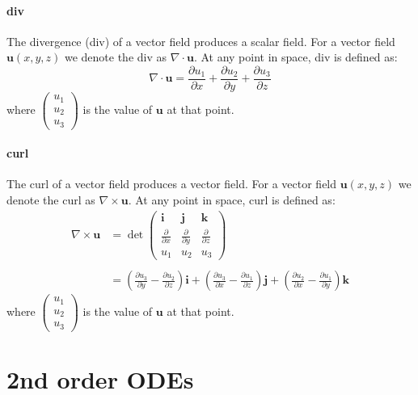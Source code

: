 \documentclass{scrartcl}
\renewcommand{\vec}[1]{\mathbf{#1}}
\begin{document}
\paragraph{div}
The divergence (div) of a vector field produces a scalar field. For a vector field $ \vec{u}(x, y, z) $ we denote the div as $ \nabla \cdot \vec{u} $. At any point in space, div is defined as:
\begin{equation}
\nabla \cdot \vec{u} = \frac{\partial u_{1}}{\partial x} + \frac{\partial u_{2}}{\partial y} + \frac{\partial u_{3}}{\partial z}
\end{equation}
where $ \begin{pmatrix}
u_{1} \\ u_{2} \\ u_{3}
\end{pmatrix} $ is the value of $ \vec{u} $ at that point.

\paragraph{curl}
The curl of a vector field produces a vector field. For a vector field $ \vec{u}(x, y, z) $ we denote the curl as $ \nabla \times \vec{u} $. At any point in space, curl is defined as:
\begin{align}
\nabla \times \vec{u} & = \det \begin{pmatrix}
\vec{i} & \vec{j} & \vec{k} \\
\frac{\partial}{\partial x} & \frac{\partial}{\partial y} & \frac{\partial}{\partial z} \\
u_{1} & u_{2} & u_{3}
\end{pmatrix} \\\\
& = (\frac{\partial u_{3}}{\partial y} - \frac{\partial u_{2}}{\partial z})\vec{i} + (\frac{\partial u_{3}}{\partial x} - \frac{\partial u_{1}}{\partial z})\vec{j} + (\frac{\partial u_{2}}{\partial x} - \frac{\partial u_{1}}{\partial y})\vec{k}
\end{align}
where $ \begin{pmatrix}
u_{1} \\ u_{2} \\ u_{3}
\end{pmatrix} $ is the value of $ \vec{u} $ at that point.

\section{2nd order ODEs}
\end{document}
